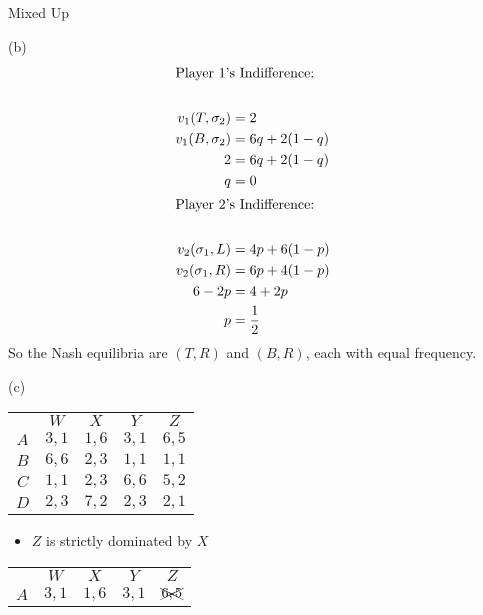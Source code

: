 \documentclass[8pt]{extarticle}
\begin{document}
\begin{problem}{Mixed Up}
\begin{problem}{(b)}
\begin{align*}
        \shortintertext{Player 1's Indifference:}\\
        v_1(T,\sigma_2) &= 2\\
        v_1(B,\sigma_2) &= 6q + 2(1-q)\\
        2 &= 6q + 2(1-q)\\
        q &= 0\\
        \shortintertext{Player 2's Indifference:}\\
        v_2(\sigma_1,L) &= 4p + 6(1-p)\\
        v_2(\sigma_1,R) &= 6p + 4(1-p)\\
        6-2p &= 4 + 2p\\
        p &= \frac{1}{2}
      \end{align*}
      So the Nash equilibria are $(T,R)$ and $(B,R)$, each with equal frequency.
    \end{problem}
    \begin{problem}{(c)}
      \begin{center}
        \renewcommand{\arraystretch}{1.5}
        \begin{tabular}{c|c|c|c|c|}
          \multicolumn{1}{c}{} & \multicolumn{1}{c}{$W$} & \multicolumn{1}{c}{$X$} & \multicolumn{1}{c}{$Y$} & \multicolumn{1}{c}{$Z$}\\
          \cline{2-5}
          $A$ & $3,1$ & $1,6$ & $3,1$ & $6,5$ \\
          \cline{2-5}
          $B$ & $6,6$ & $2,3$ & $1,1$ & $1,1$ \\
          \cline{2-5}
          $C$ & $1,1$ & $2,3$ & $6,6$ & $5,2$ \\
          \cline{2-5}
          $D$ & $2,3$ & $7,2$ & $2,3$ & $2,1$\\
          \cline{2-5}
        \end{tabular}
      \end{center}
      \tcblower
      \begin{itemize}
        \item $Z$ is strictly dominated by $X$
      \end{itemize}
      \begin{center}
        \renewcommand{\arraystretch}{1.5}
        \begin{tabular}{c|c|c|c|c|}
          \multicolumn{1}{c}{} & \multicolumn{1}{c}{$W$} & \multicolumn{1}{c}{$X$} & \multicolumn{1}{c}{$Y$} & \multicolumn{1}{c}{$Z$}\\
          \cline{2-5}
          $A$ & $3,1$ & $1,6$ & $3,1$ & $\xcancel{6,5}$ \\

\end{tabular}
\end{center}
\end{problem}
\end{problem}
\end{document}
